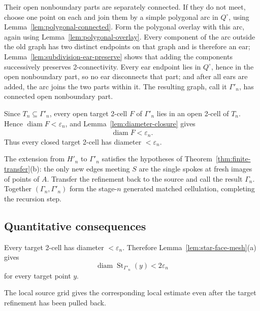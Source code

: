 \documentclass[11pt]{article}
\theoremstyle{mainplain}
\theoremstyle{mainroman}
\theoremstyle{definition}
\numberwithin{equation}{section}
\begin{document}
Their open nonboundary parts are separately connected. If they do not meet, choose one point on each and join them by a simple polygonal arc in \(Q^\circ\), using Lemma~\ref{lem:polygonal-connected}. Form the polygonal overlay with this arc, again using Lemma~\ref{lem:polygonal-overlay}. Every component of the arc outside the old graph has two distinct endpoints on that graph and is therefore an ear; Lemma~\ref{lem:subdivision-ear-preserve} shows that adding the components successively preserves 2-connectivity. Every ear endpoint lies in \(Q^\circ\), hence in the open nonboundary part, so no ear disconnects that part; and after all ears are added, the arc joins the two parts within it. The resulting graph, call it \(\Gamma'_n\), has connected open nonboundary part.

Since \(T_n\subseteq\Gamma'_n\), every open target 2-cell \(F\) of
\(\Gamma'_n\) lies in an open 2-cell of \(T_n\). Hence
\(\operatorname{diam}F<\varepsilon_n\), and
Lemma~\ref{lem:diameter-closure} gives
\[
 \operatorname{diam}\overline F<\varepsilon_n.
\]
Thus every closed target 2-cell has diameter
\(<\varepsilon_n\).

The extension from \(H'_n\) to \(\Gamma'_n\) satisfies the hypotheses of Theorem~\ref{thm:finite-transfer}\textup{(b)}: the only new edges meeting \(S\) are the single spokes at fresh images of points of \(A\). Transfer the refinement back to the source and call the result \(\Gamma_n\). Together \((\Gamma_n,\Gamma'_n)\) form the stage-\(n\) generated matched cellulation, completing the recursion step.

\subsection{Quantitative consequences}\label{quantitative-consequences}

Every target 2-cell has diameter $<\varepsilon_n$. Therefore
Lemma~\ref{lem:star-face-mesh}\textup{(a)} gives
\[
 \operatorname{diam}\operatorname{St}_{\Gamma'_n}(y)
 <2\varepsilon_n
\]
for every target point $y$.

The local source grid gives the corresponding local estimate even after the target refinement has been pulled back.
\end{document}
